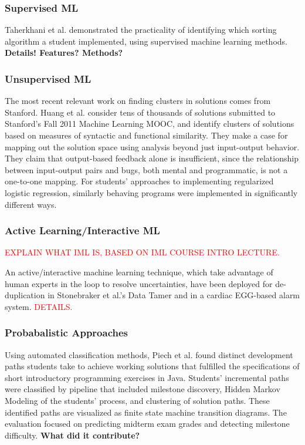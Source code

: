 \documentclass[12pt]{article}
\begin{document}
\subsubsection{Supervised ML}

Taherkhani et al. \cite{taherkhani12} demonstrated the practicality of identifying which sorting algorithm a student implemented, using supervised machine learning methods. \textbf{Details! Features? Methods?}

\subsubsection{Unsupervised ML}

The most recent relevant work on finding clusters in solutions comes from Stanford. Huang et al. \cite{MOOCshop} consider tens of thousands of solutions submitted to Stanford's Fall 2011 Machine Learning MOOC, and identify clusters of solutions based on measures of syntactic and functional similarity. They make a case for mapping out the solution space using analysis beyond just input-output behavior. They claim that output-based feedback alone is insufficient, since the relationship between input-output pairs and bugs, both mental and programmatic, is not a one-to-one mapping.  For students' approaches to implementing regularized logistic regression, similarly behaving programs were implemented in significantly different ways. 

\subsubsection{Active Learning/Interactive ML}

\textcolor{red}{EXPLAIN WHAT IML IS, BASED ON IML COURSE INTRO LECTURE.}

An active/interactive machine learning technique, which take advantage of human experts in the loop to resolve uncertainties, have been deployed for de-duplication in Stonebraker et al.'s Data Tamer \cite{DataTamer} and in a cardiac EGG-based alarm system\cite{JWiens}. \textcolor{red}{DETAILS.}

\subsubsection{Probabalistic Approaches}

Using automated classification methods, Piech et al. \cite{Piech} found distinct development paths students take to achieve working solutions that fulfilled the specifications of short introductory programming exercises in Java. Students' incremental paths were classified by pipeline that included milestone discovery, Hidden Markov Modeling of the students' process, and clustering of solution paths. These identified paths are visualized as finite state machine transition diagrams. The evaluation focused on predicting midterm exam grades and detecting milestone difficulty. \textbf{What did it contribute?}
\end{document}

